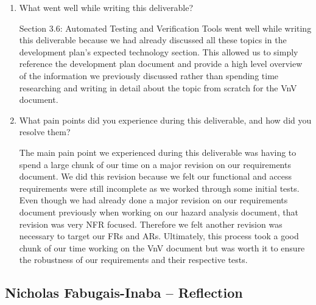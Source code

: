 \documentclass[12pt, titlepage]{article}
\begin{document}
\begin{enumerate}
  \item What went well while writing this deliverable?
  
  Section 3.6: Automated Testing and Verification Tools went well while writing 
  this deliverable because we had already discussed all these topics in the 
  development plan’s expected technology section. This allowed us to simply 
  reference the development plan document and provide a high level overview of the 
  information we previously discussed rather than spending time researching and 
  writing in detail about the topic from scratch for the VnV document.

  \item What pain points did you experience during this deliverable, and how
    did you resolve them?
  
  The main pain point we experienced during this deliverable was having to spend a 
  large chunk of our time on a major revision on our requirements document. We did 
  this revision because we felt our functional and access requirements were still 
  incomplete as we worked through some initial tests. Even though we had already 
  done a major revision on our requirements document previously when working on our 
  hazard analysis document, that revision was very NFR focused. Therefore we felt 
  another revision was necessary to target our FRs and ARs. Ultimately, this process 
  took a good chunk of our time working on the VnV document but was worth it to 
  ensure the robustness of our requirements and their respective tests.
\end{enumerate}

\subsection*{Nicholas Fabugais-Inaba -- Reflection}
\end{document}
